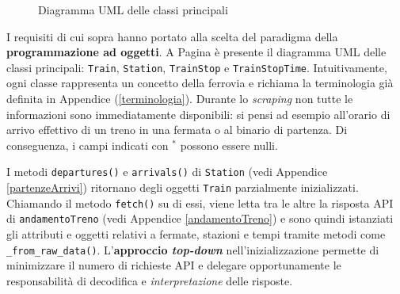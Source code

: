 \documentclass[12pt,italian]{report}
\begin{document}
{\begin{landscape}
\begin{figure}[h]
            \caption{Diagramma UML delle classi principali}
            \vfill
        \end{figure}
    \end{landscape}
    \restoregeometry }

I requisiti di cui sopra hanno portato alla scelta del paradigma della
\textbf{programmazione ad oggetti}.  A Pagina \pageref{uml_classi} è
presente il diagramma UML delle classi principali: \texttt{Train},
\texttt{Station}, \texttt{TrainStop} e \texttt{TrainStopTime}.
Intuitivamente, ogni classe rappresenta un concetto della ferrovia e
richiama la terminologia già definita in Appendice
(\ref{terminologia}).  Durante lo \textit{scraping} non tutte le
informazioni sono immediatamente disponibili: si pensi ad esempio
all'orario di arrivo effettivo di un treno in una fermata o al binario
di partenza.  Di conseguenza, i campi indicati con $^*$ possono essere
nulli.

I metodi \texttt{departures()} e \texttt{arrivals()} di
\texttt{Station} (vedi Appendice \ref{partenzeArrivi}) ritornano degli
oggetti \texttt{Train} parzialmente inizializzati.  Chiamando il
metodo \texttt{fetch()} su di essi, viene letta tra le altre la
risposta API di \texttt{andamentoTreno} (vedi Appendice
\ref{andamentoTreno}) e sono quindi istanziati gli attributi e oggetti
relativi a fermate, stazioni e tempi tramite metodi come
\texttt{\_from\_raw\_data()}.  L'\textbf{approccio \textit{top-down}}
nell'inizializzazione permette di minimizzare il numero di richieste
API e delegare opportunamente le responsabilità di decodifica e
\textit{interpretazione} delle risposte.
\end{document}
